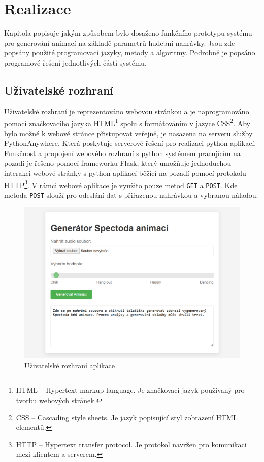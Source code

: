 \section{Realizace} \label{sec:Realizace}

Kapitola popisuje jakým způsobem bylo dosaženo funkčního prototypu systému pro generování animací na základě parametrů hudební nahrávky. Jsou zde popsány použité programovací jazyky, metody a algoritmy. Podrobně je popsáno programové řešení jednotlivých částí systému. 

\subsection{Uživatelské rozhraní}

Uživatelské rozhraní je reprezentováno webovou stránkou a je naprogramováno pomocí značkovacího jazyka \acs{HTML}\footnote{HTML -- Hypertext markup language. Je značkovací jazyk používaný pro tvorbu webových stránek.} spolu s formátováním v jazyce \acs{CSS}\footnote{CSS -- Cascading style sheets. Je jazyk popisující styl zobrazení HTML elementů\cite{CSS}.}. Aby bylo možné k webové stránce přistupovat veřejně, je nasazena na serveru služby PythonAnywhere. Která poskytuje serverové řešení pro realizaci python aplikací. Funkčnost a propojení webového rozhraní s python systémem pracujícím na pozadí je řešeno pomocí frameworku Flask, který umožňuje jednoduchou interakci webové stránky s python aplikací běžící na pozadí pomocí protokolu HTTP\footnote{HTTP -- Hypertext transfer protocol. Je protokol navržen pro komunikaci mezi klientem a serverem.}. V rámci webové aplikace je využito pouze metod \texttt{GET} a \texttt{POST}. Kde metoda \texttt{POST} slouží pro odeslání dat s přiřazenou nahrávkou a vybranou náladou.

\begin{figure}[H]
    \centering
    \includegraphics[width = 1\linewidth]{obrazky/Uzivatelske_rozhrani.png}
    \caption{Uživatelské rozhraní aplikace}
    \label{fig:Uzivatelske_rozhrani}
\end{figure}

